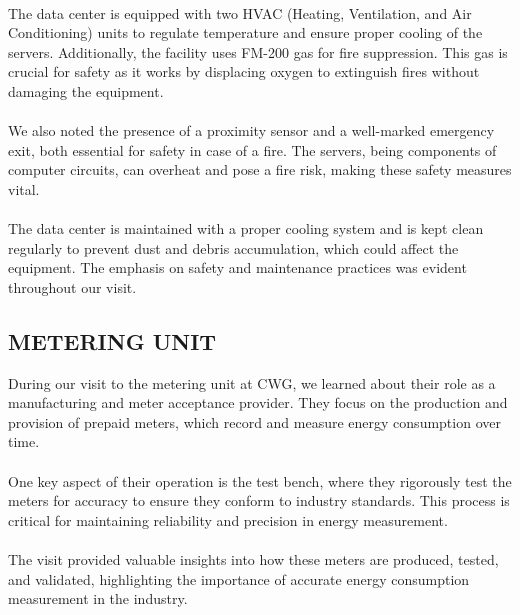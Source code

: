 \documentclass[a4paper,12pt]{report}
\begin{document}
\paragraph{}
The data center is equipped with two HVAC (Heating, Ventilation, and Air Conditioning) units to regulate temperature and ensure proper cooling of the servers. Additionally, the facility uses FM-200 gas for fire suppression. This gas is crucial for safety as it works by displacing oxygen to extinguish fires without damaging the equipment.

\paragraph{}
We also noted the presence of a proximity sensor and a well-marked emergency exit, both essential for safety in case of a fire. The servers, being components of computer circuits, can overheat and pose a fire risk, making these safety measures vital.

\paragraph{}
The data center is maintained with a proper cooling system and is kept clean regularly to prevent dust and debris accumulation, which could affect the equipment. The emphasis on safety and maintenance practices was evident throughout our visit.

\subsection[Metering unit]{METERING UNIT}
During our visit to the metering unit at CWG, we learned about their role as a manufacturing and meter acceptance provider. They focus on the production and provision of prepaid meters, which record and measure energy consumption over time.

\paragraph{}
One key aspect of their operation is the test bench, where they rigorously test the meters for accuracy to ensure they conform to industry standards. This process is critical for maintaining reliability and precision in energy measurement.

\paragraph{}
The visit provided valuable insights into how these meters are produced, tested, and validated, highlighting the importance of accurate energy consumption measurement in the industry.
\end{document}
